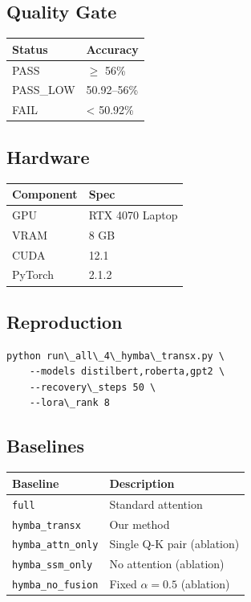 \subsection{Quality Gate}

\begin{table}[H]
\centering
\small
\begin{tabular}{ll}
\toprule
\textbf{Status} & \textbf{Accuracy} \\
\midrule
PASS & $\ge$ 56\% \\
PASS\_LOW & 50.92--56\% \\
FAIL & \textless{} 50.92\% \\
\bottomrule
\end{tabular}
\end{table}

\subsection{Hardware}

\begin{table}[H]
\centering
\small
\begin{tabular}{ll}
\toprule
\textbf{Component} & \textbf{Spec} \\
\midrule
GPU & RTX 4070 Laptop \\
VRAM & 8 GB \\
CUDA & 12.1 \\
PyTorch & 2.1.2 \\
\bottomrule
\end{tabular}
\end{table}

\subsection{Reproduction}

\begin{lstlisting}
python run\_all\_4\_hymba\_transx.py \
    --models distilbert,roberta,gpt2 \
    --recovery\_steps 50 \
    --lora\_rank 8
\end{lstlisting}

\subsection{Baselines}

\begin{table}[H]
\centering
\small
\begin{tabular}{ll}
\toprule
\textbf{Baseline} & \textbf{Description} \\
\midrule
\texttt{full} & Standard attention \\
\texttt{hymba\_transx} & Our method \\
\texttt{hymba\_attn\_only} & Single Q-K pair (ablation) \\
\texttt{hymba\_ssm\_only} & No attention (ablation) \\
\texttt{hymba\_no\_fusion} & Fixed $\alpha = 0.5$ (ablation) \\
\bottomrule
\end{tabular}
\end{table}

